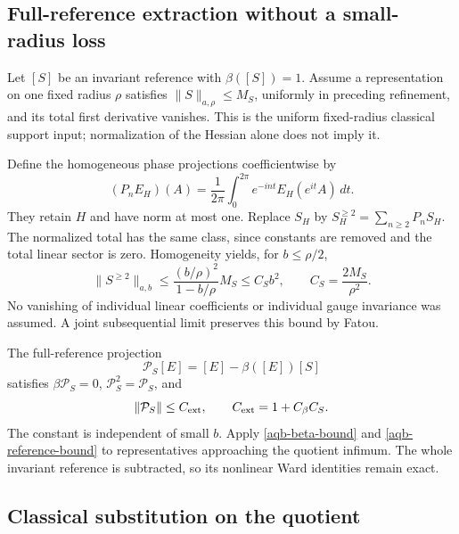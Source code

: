 \subsection{Full-reference extraction without a small-radius loss}
\label{aqb-extraction-section}

Let $[S]$ be an invariant reference with $\beta([S])=1$.
Assume a representation on one fixed radius $\rho$ satisfies
$\|S\|_{a,\rho}\le M_S$, uniformly in preceding refinement,
and its total first derivative vanishes. This is the uniform
fixed-radius classical support input; normalization of the
Hessian alone does not imply it.

Define the homogeneous phase projections coefficientwise by
\begin{equation}
 (P_nE_H)(A)=\frac1{2\pi}\int_0^{2\pi}
                     e^{-int}E_H(e^{it}A)\,dt.
 \label{aqb-phase-projection}
\end{equation}
They retain $H$ and have norm at most one. Replace $S_H$ by
$S_H^{\ge2}=\sum_{n\ge2}P_nS_H$. The normalized total has
the same class, since constants are removed and the total
linear sector is zero. Homogeneity yields, for $b\le\rho/2$,
\begin{equation}
 \|S^{\ge2}\|_{a,b}
 \le\frac{(b/\rho)^2}{1-b/\rho}M_S
 \le C_Sb^2,
 \qquad C_S=\frac{2M_S}{\rho^2}.
 \label{aqb-reference-bound}
\end{equation}
No vanishing of individual linear coefficients or individual
gauge invariance was assumed. A joint subsequential limit
preserves this bound by Fatou.

The full-reference projection
\begin{equation}
 \mathcal P_S[E]=[E]-\beta([E])[S]
 \label{aqb-extraction}
\end{equation}
satisfies $\beta\mathcal P_S=0$, $\mathcal P_S^2=\mathcal P_S$,
and
\begin{equation}
 \|\mathcal P_S\|\le C_{\rm ext},
 \qquad C_{\rm ext}=1+C_\beta C_S.
 \label{aqb-extraction-bound}
\end{equation}
The constant is independent of small $b$. Apply
\eqref{aqb-beta-bound} and \eqref{aqb-reference-bound} to
representatives approaching the quotient infimum. The whole
invariant reference is subtracted, so its nonlinear Ward
identities remain exact.

\subsection{Classical substitution on the quotient}
\label{aqb-descent-section}


